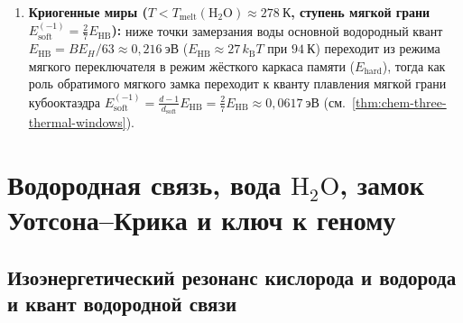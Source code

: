 \begin{corollary}[Диофантов отбор соизмеримых полимерных хребтов ($Z_1 + Z_2 = N_\varphi = 13$) и два планетарных класса биосфер]
\begin{enumerate}[leftmargin=*,noitemsep]
\item \textbf{Криогенные миры ($T < T_{\mathrm{melt}}(\text{H}_2\text{O}) \approx 278\ \mathrm{К}$, ступень мягкой грани $E_{\mathrm{soft}}^{(-1)} = \frac{2}{7}E_{\mathrm{HB}}$):}
  ниже точки замерзания воды основной водородный квант $E_{\mathrm{HB}} = BE_H/63 \approx 0{,}216\ \mathrm{эВ}$ ($E_{\mathrm{HB}} \approx 27\,k_{\mathrm{B}}T$ при $94\ \mathrm{К}$) переходит из режима мягкого переключателя в режим жёсткого каркаса памяти ($E_{\mathrm{hard}}$), тогда как роль обратимого мягкого замка переходит к кванту плавления мягкой грани кубооктаэдра $E_{\mathrm{soft}}^{(-1)} = \frac{d-1}{d_{\mathrm{soft}}}E_{\mathrm{HB}} = \frac{2}{7}E_{\mathrm{HB}} \approx 0{,}0617\ \mathrm{эВ}$ (см.\ \cref{thm:chem-three-thermal-windows}).
\end{enumerate}
\end{corollary}

\chapter{Водородная связь, вода \texorpdfstring{$\text{H}_2\text{O}$}{H2O}, замок Уотсона--Крика и ключ к геному}
\label{ch:chem-hbond-genome}

\section{Изоэнергетический резонанс кислорода и водорода и квант водородной связи}
\label{sec:chem-hbond-quantum}

